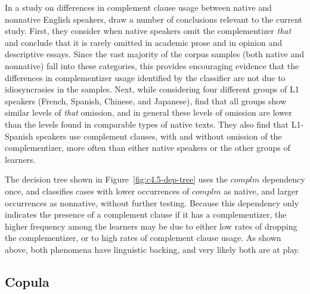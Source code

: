 \documentclass[main.tex]{subfiles}
\begin{document}
In a study on differences in complement clause usage between native and nonnative English speakers, \citet{biber:1998} draw a number of conclusions relevant to the current study. First, they consider when native speakers omit the complementizer \textit{that} and conclude that it is rarely omitted in academic prose and in opinion and descriptive essays. Since the vast majority of the corpus samples (both native and nonnative) fall into these categories, this provides encouraging evidence that the differences in complementizer usage identified by the classifier are not due to idiosyncrasies in the samples. Next, while considering four different groups of L1 speakers (French, Spanish, Chinese, and Japanese), \citeauthor{biber:1998} find that all groups show similar levels of \textit{that} omission, and in general these levels of omission are lower than the levels found in comparable types of native texts. They also find that L1-Spanish speakers use complement clauses, with and without omission of the complementizer, more often than either native speakers or the other groups of learners.

The decision tree shown in Figure~\ref{fig:c4.5-dep-tree} uses the $complm$ dependency once, and classifies cases with lower occurrences of $complm$ as native, and larger occurrences as nonnative, without further testing. Because this dependency only indicates the presence of a complement clause if it has a complementizer, the higher frequency among the learners may be due to either low rates of dropping the complementizer, or to high rates of complement clause usage. As shown above, both phenomena have linguistic backing, and very likely both are at play. 

\subsection{Copula}
\end{document}

